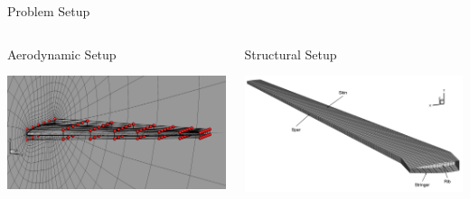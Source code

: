 \documentclass{bredelebeamer}
\begin{document}
\begin{frame}{Problem Setup}
  \begin{columns}
    \begin{column}{0.5\textwidth}
      \begin{center}
        Aerodynamic Setup
      \end{center}
      \includegraphics[width=1.0\linewidth]{images/aerostruct-aeroMeshFFD.png}
    \end{column}
    \begin{column}{0.5\textwidth}
      \begin{center}
        Structural Setup
      \end{center}
      \includegraphics[width=1.0\linewidth]{images/aerostruct-structSetup.png}
    \end{column}
  \end{columns}
\end{frame}
\end{document}
